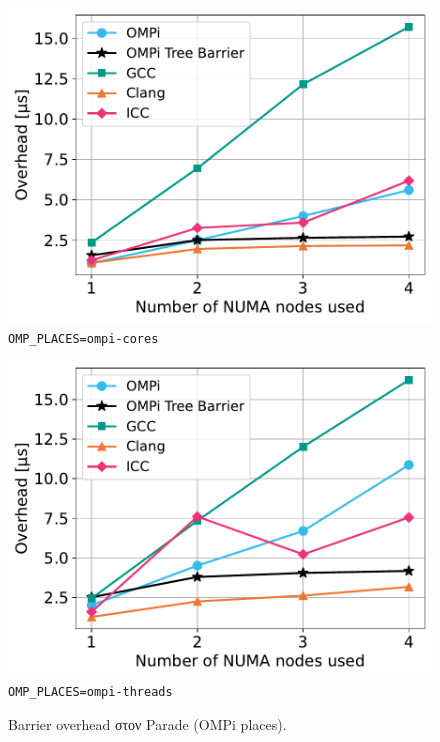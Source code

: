 \begin{figure}
    \centering
    \begin{minipage}{0.5\textwidth}
        \centering
        \includegraphics[width=1\textwidth]{Figures/epcc_20210823_175412/ompi-places_cores_close.pdf}
		\texttt{OMP\_PLACES=ompi-cores}
    \end{minipage}\hfill
    \begin{minipage}{0.5\textwidth}
        \centering
        \includegraphics[width=1\textwidth]{Figures/epcc_20210823_175412/ompi-places_threads_close.pdf}
        \texttt{OMP\_PLACES=ompi-threads}
    \end{minipage}
    \caption{Barrier overhead στον Parade (OMPi places).}
    \label{fig:bo-parade-ompi-places}
\end{figure}

